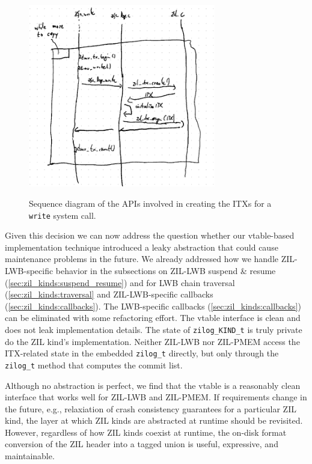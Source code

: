 \documentclass[12pt,a4paper,twoside]{book}
\begin{document}
\begin{figure}
    \includegraphics[height=8cm]{fig/zfs_log_write_sequence_diagram}
    \label{fig:zfs_log_write_sequence_diagram}
    \caption{Sequence diagram of the APIs involved in creating the ITXs for a \lstinline{write} system call.}
\end{figure}

Given this decision we can now address the question whether our vtable-based implementation technique introduced a leaky abstraction that could cause maintenance problems in the future.
We already addressed how we handle ZIL-LWB-specific behavior in the subsections on ZIL-LWB suspend \& resume (\ref{sec:zil_kinds:suspend_resume}) and for LWB chain traversal (\ref{sec:zil_kinds:traversal} and ZIL-LWB-specific callbacks (\ref{sec:zil_kinds:callbacks}).
The LWB-specific callbacks (\ref{sec:zil_kinds:callbacks}) can be eliminated with some refactoring effort.
The vtable interface is clean and does not leak implementation details.
The state of \lstinline{zilog_KIND_t} is truly private do the ZIL kind's implementation.
Neither ZIL-LWB nor ZIL-PMEM access the ITX-related state in the embedded \lstinline{zilog_t} directly, but only through the \lstinline{zilog_t} method that computes the commit list.

Although no abstraction is perfect, we find that the vtable is a reasonably clean interface that works well for ZIL-LWB and ZIL-PMEM.
If requirements change in the future, e.g., relaxiation of crash consistency guarantees for a particular ZIL kind, the layer at which ZIL kinds are abstracted at runtime should be revisited.
However, regardless of how ZIL kinds coexist at runtime, the on-disk format conversion of the ZIL header into a tagged union is useful, expressive, and maintainable.
\end{document}
